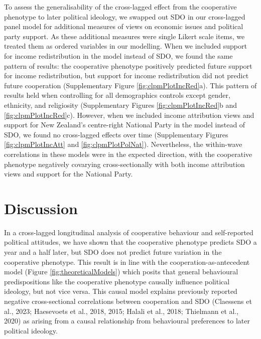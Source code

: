 \documentclass[
  man,floatsintext]{apa6}
\begin{document}
To assess the generalisability of the cross-lagged effect from the cooperative phenotype to later political ideology, we swapped out SDO in our cross-lagged panel model for additional measures of views on economic issues and political party support. As these additional measures were single Likert scale items, we treated them as ordered variables in our modelling. When we included support for income redistribution in the model instead of SDO, we found the same pattern of results: the cooperative phenotype positively predicted future support for income redistribution, but support for income redistribution did not predict future cooperation (Supplementary Figure \ref{fig:clpmPlotIncRed}a). This pattern of results held when controlling for all demographics controls except gender, ethnicity, and religiosity (Supplementary Figures \ref{fig:clpmPlotIncRed}b and \ref{fig:clpmPlotIncRed}c). However, when we included income attribution views and support for New Zealand's centre-right National Party in the model instead of SDO, we found no cross-lagged effects over time (Supplementary Figures \ref{fig:clpmPlotIncAtt} and \ref{fig:clpmPlotPolNat}). Nevertheless, the within-wave correlations in these models were in the expected direction, with the cooperative phenotype negatively covarying cross-sectionally with both income attribution views and support for the National Party.

\hypertarget{discussion}{%
\section{Discussion}\label{discussion}}

In a cross-lagged longitudinal analysis of cooperative behaviour and self-reported political attitudes, we have shown that the cooperative phenotype predicts SDO a year and a half later, but SDO does not predict future variation in the cooperative phenotype. This result is in line with the cooperation-as-antecedent model (Figure \ref{fig:theoreticalModels}) which posits that general behavioural predispositions like the cooperative phenotype causally influence political ideology, but not vice versa. This causal model explains previously reported negative cross-sectional correlations between cooperation and SDO (Claessens et al., 2023; Haesevoets et al., 2018, 2015; Halali et al., 2018; Thielmann et al., 2020) as arising from a causal relationship from behavioural preferences to later political ideology.
\end{document}
